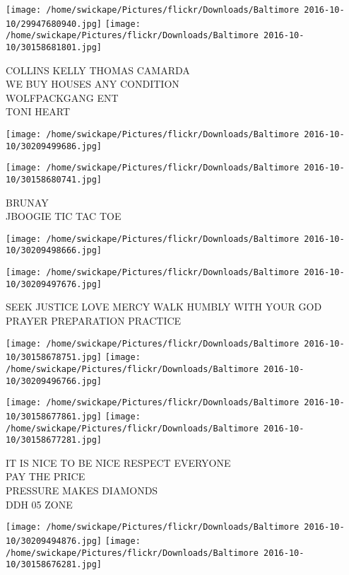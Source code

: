 \documentclass[10pt,letterpaper]{article}
\begin{document}
\texttt{[image: /home/swickape/Pictures/flickr/Downloads/Baltimore 2016-10-10/29947680940.jpg]}
\texttt{[image: /home/swickape/Pictures/flickr/Downloads/Baltimore 2016-10-10/30158681801.jpg]}

COLLINS KELLY THOMAS CAMARDA\\
WE BUY HOUSES ANY CONDITION\\
WOLFPACKGANG ENT\\
TONI HEART
\pagebreak

\texttt{[image: /home/swickape/Pictures/flickr/Downloads/Baltimore 2016-10-10/30209499686.jpg]}

\vspace{0.25in}
\texttt{[image: /home/swickape/Pictures/flickr/Downloads/Baltimore 2016-10-10/30158680741.jpg]}

BRUNAY\\
JBOOGIE TIC TAC TOE
\pagebreak

\texttt{[image: /home/swickape/Pictures/flickr/Downloads/Baltimore 2016-10-10/30209498666.jpg]}

\vspace{0.25in}
\texttt{[image: /home/swickape/Pictures/flickr/Downloads/Baltimore 2016-10-10/30209497676.jpg]}

SEEK JUSTICE LOVE MERCY WALK HUMBLY WITH YOUR GOD\\
PRAYER PREPARATION PRACTICE
\pagebreak

\texttt{[image: /home/swickape/Pictures/flickr/Downloads/Baltimore 2016-10-10/30158678751.jpg]}
\texttt{[image: /home/swickape/Pictures/flickr/Downloads/Baltimore 2016-10-10/30209496766.jpg]}

\texttt{[image: /home/swickape/Pictures/flickr/Downloads/Baltimore 2016-10-10/30158677861.jpg]}
\texttt{[image: /home/swickape/Pictures/flickr/Downloads/Baltimore 2016-10-10/30158677281.jpg]}

IT IS NICE TO BE NICE RESPECT EVERYONE\\
PAY THE PRICE\\
PRESSURE MAKES DIAMONDS\\
DDH 05 ZONE
\pagebreak

\texttt{[image: /home/swickape/Pictures/flickr/Downloads/Baltimore 2016-10-10/30209494876.jpg]}
\texttt{[image: /home/swickape/Pictures/flickr/Downloads/Baltimore 2016-10-10/30158676281.jpg]}
\end{document}
